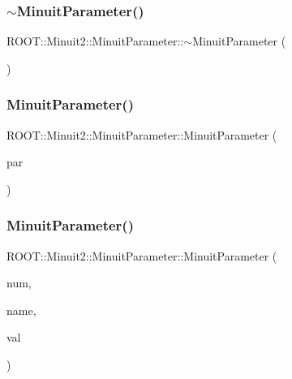 \subsubsection{\texorpdfstring{$\sim$MinuitParameter()}{~MinuitParameter()}\hspace{0.1cm}{\footnotesize\ttfamily [1/2]}}
{\footnotesize\ttfamily R\+O\+O\+T\+::\+Minuit2\+::\+Minuit\+Parameter\+::$\sim$\+Minuit\+Parameter (\begin{DoxyParamCaption}{ }\end{DoxyParamCaption})\hspace{0.3cm}{\ttfamily [inline]}}

\mbox{\label{classROOT_1_1Minuit2_1_1MinuitParameter_a0ac95809b18c619597764fcfabcb70fe}} 
\subsubsection{\texorpdfstring{MinuitParameter()}{MinuitParameter()}\hspace{0.1cm}{\footnotesize\ttfamily [4/8]}}
{\footnotesize\ttfamily R\+O\+O\+T\+::\+Minuit2\+::\+Minuit\+Parameter\+::\+Minuit\+Parameter (\begin{DoxyParamCaption}\item[{const \mbox{\hyperlink{classROOT_1_1Minuit2_1_1MinuitParameter}{Minuit\+Parameter}} \&}]{par }\end{DoxyParamCaption})\hspace{0.3cm}{\ttfamily [inline]}}

\mbox{\label{classROOT_1_1Minuit2_1_1MinuitParameter_afa9a57b4990491316502a21e09b756bc}} 
\subsubsection{\texorpdfstring{MinuitParameter()}{MinuitParameter()}\hspace{0.1cm}{\footnotesize\ttfamily [5/8]}}
{\footnotesize\ttfamily R\+O\+O\+T\+::\+Minuit2\+::\+Minuit\+Parameter\+::\+Minuit\+Parameter (\begin{DoxyParamCaption}\item[{unsigned int}]{num,  }\item[{const std\+::string \&}]{name,  }\item[{double}]{val }\end{DoxyParamCaption})\hspace{0.3cm}{\ttfamily [inline]}}

